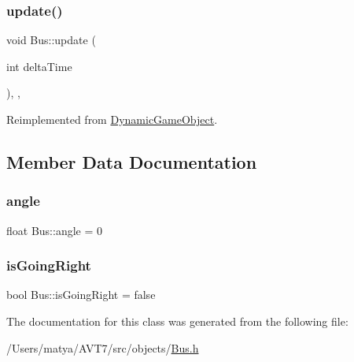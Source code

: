 \mbox{\label{class_bus_ad07157ce2a50211ea599d040da7a4517}} 
\subsubsection{\texorpdfstring{update()}{update()}}
{\footnotesize\ttfamily void Bus\+::update (\begin{DoxyParamCaption}\item[{int}]{delta\+Time }\end{DoxyParamCaption})\hspace{0.3cm}{\ttfamily [inline]}, {\ttfamily [final]}, {\ttfamily [virtual]}}



Reimplemented from \hyperlink{class_dynamic_game_object_aaa505b57d131bbbce44d500ec2ca0e83}{Dynamic\+Game\+Object}.



\subsection{Member Data Documentation}
\mbox{\label{class_bus_ab2899ff7aa88eccd9ec84a79355b671b}} 
\subsubsection{\texorpdfstring{angle}{angle}}
{\footnotesize\ttfamily float Bus\+::angle = 0}

\mbox{\label{class_bus_ad27976dad538444f6e95212834d989a8}} 
\subsubsection{\texorpdfstring{is\+Going\+Right}{isGoingRight}}
{\footnotesize\ttfamily bool Bus\+::is\+Going\+Right = false}



The documentation for this class was generated from the following file\+:\begin{DoxyCompactItemize}
\item 
/\+Users/matya/\+A\+V\+T7/src/objects/\hyperlink{_bus_8h}{Bus.\+h}\end{DoxyCompactItemize}
